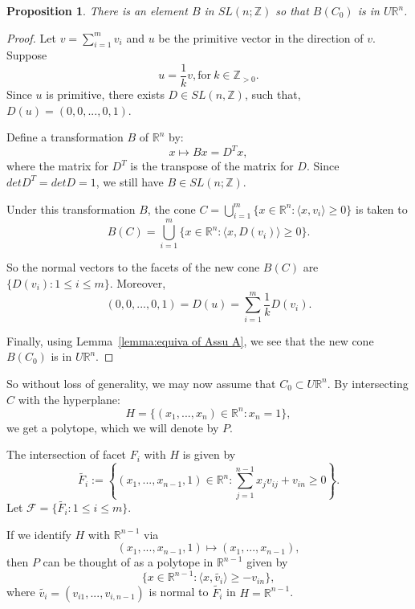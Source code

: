 \documentclass[12pt]{amsart}
\def\Z {{\mathbb{Z}}}
\def\R {{\mathbb{R}}}
\def\F {{\mathcal{F}}}
\newtheorem{proposition}[theorem]{Proposition}
\theoremstyle{definition}
\numberwithin{equation}{section}
\begin{document}
\begin{proposition}\label{prop:moving to upper half}
There is an element $B$ in $SL(n;\Z)$ so that $B(C_{0})$ is in
$U\R^n$.
\end{proposition}
\begin{proof}
Let $v=\sum_{i=1}^{m}v_{i}$ and $u$ be the primitive vector in the
direction of $v$. Suppose
\begin{equation*}
u=\frac{1}{k}v, \mbox{for}\ k\in \Z_{>0}.
\end{equation*}
Since $u$ is primitive, there exists $D\in SL(n,\Z)$, such that,
$D(u)=(0,0,...,0,1)$.

Define a transformation $B$ of $\R^n$ by:
\begin{equation}
x\mapsto Bx= D^{T}x ,
\end{equation}
where the matrix for $D^{T}$ is the transpose of the matrix for $D$.
Since $det D^{T}=det D=1$, we still have $B\in SL(n;\Z)$.

Under this transformation $B$, the cone $C = \bigcup_{i=1}^{m}\{x\in
\R^n: \langle x, v_{i}\rangle \geq 0\}$ is taken to
\begin{equation}B(C)= \bigcup_{i=1}^{m}\{x\in \R^n: \langle x,
D(v_{i})\rangle \geq 0\}.\end{equation}

So the normal vectors to the facets of the new cone $B(C)$ are
$\{D(v_{i}):1\leq i\leq m\}$. Moreover,
\begin{equation}
(0,0,...,0,1)=D(u)=\sum_{i=1}^{m}\frac{1}{k}D(v_{i}).
\end{equation}

Finally, using Lemma~\ref{lemma:equiva of Assu A}, we see that the
new cone $B(C_{0})$ is in $U\R^n$.
\end{proof}


So without loss of generality, we may now assume that $C_{0}\subset
U\R^n$. By intersecting $C$ with the hyperplane:
\begin{equation}
H= \{(x_{1},...,x_{n})\in \R^n: x_{n}=1\},
\end{equation}
we get a polytope, which we will denote by $P$.

The intersection of facet $F_{i}$ with $H$ is given by
\[\tilde{F_{i}}:=\left\{(x_{1},...,x_{n-1},1)\in \R^n:\sum_{j=1}^{n-1}x_{j}v_{ij}+v_{in} \geq 0\right\}.\]
Let $\F= \{\tilde{F_{i}}:1\leq i\leq m\}$.

 If we identify $H$ with $\R^{n-1}$ via
\[(x_{1},...,x_{n-1},1)\mapsto (x_{1},...,x_{n-1}),\]
 then $P$ can be thought
of as a polytope in $\R^{n-1}$ given by
\begin{equation}
 \{x\in
\R^{n-1}: \langle x,\tilde{v_{i}}\rangle \geq -v_{in}\},
\end{equation}
where $\tilde{v_{i}}=(v_{i1},...,v_{i,n-1})$ is normal to
$\tilde{F_{i}}$ in $H=\R^{n-1}$.
\end{document}
